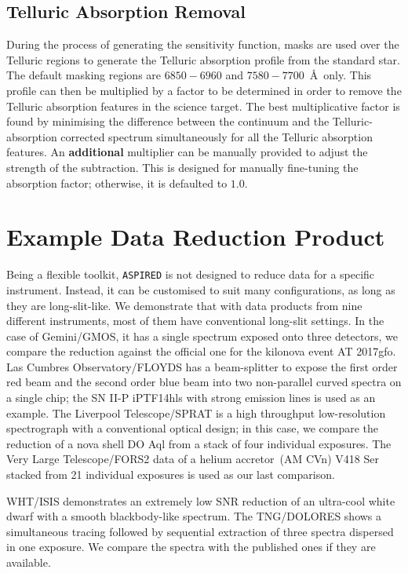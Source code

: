 \documentclass[twocolumn, linenumbers]{aastex631}
\begin{document}
\subsection{Telluric Absorption Removal}
During the process of generating the sensitivity function, masks are used
over the Telluric regions to generate the Telluric absorption
profile from the standard star. The default masking regions are $6850-6960$
and $7580-7700$\ \AA\ only. This profile can then be multiplied
by a factor to be determined in order to remove the Telluric absorption
features in the science target. The best multiplicative factor is found
by minimising the difference between the continuum and the Telluric-absorption
corrected spectrum simultaneously for all the Telluric absorption features.
An \textbf{additional} multiplier can be manually provided to adjust the
strength of the subtraction. This is designed for manually fine-tuning the
absorption factor; otherwise, it is defaulted to $1.0$.

\section{Example Data Reduction Product}
Being a flexible toolkit, \texttt{ASPIRED} is not designed to reduce data for a
specific instrument. Instead, it can be customised to suit many configurations,
as long as they are long-slit-like. We demonstrate that with data products
from nine different instruments, most of them have conventional long-slit settings.
In the case of Gemini/GMOS, it has a single spectrum exposed onto three detectors,
we compare the reduction against the official one for the kilonova event AT 2017gfo.
Las Cumbres Observatory/FLOYDS has a beam-splitter to expose the first order red
beam and the second order blue beam into two non-parallel curved spectra on a
single chip; the SN II-P iPTF14hls with strong emission lines is used as an example.
The Liverpool Telescope/SPRAT is a high throughput low-resolution spectrograph
with a conventional optical design; in this case, we compare the reduction of
a nova shell DO Aql from a stack of four individual exposures. The Very Large
Telescope/FORS2 data of a helium accretor~(AM CVn) V418 Ser stacked from 21
individual exposures is used as our last comparison.

WHT/ISIS demonstrates an extremely low SNR reduction of an ultra-cool white
dwarf with a smooth blackbody-like spectrum. The TNG/DOLORES shows a
simultaneous tracing followed by sequential extraction of three spectra
dispersed in one exposure. We compare the spectra with the published ones if
they are available.
\end{document}
